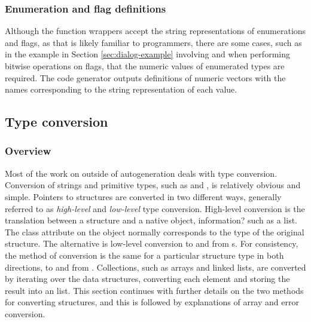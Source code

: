 \documentclass[article,shortnames]{jss}
\begin{document}
\subsubsection{Enumeration and flag definitions}
Although the function wrappers accept the string representations of
enumerations 
and flags, as that is likely familiar to  programmers,
there are
some cases, such as in the example in Section \ref{sec:dialog-example}
involving 
 and when performing bitwise operations on
flags, that the
numeric values of enumerated types are required. The code generator
outputs 
definitions of  numeric vectors with the names
corresponding to the
string representation of each value.

\subsection{Type conversion}

\subsubsection{Overview}

Most of the work on  outside of autogeneration deals with
type 
conversion. Conversion of strings and primitive  types,
such as  and 
, is relatively obvious and simple. Pointers to
 structures are converted
in two different ways, generally referred to as \emph{high-level}
and \emph{low-level} type conversion. 
High-level conversion is the
translation
between a  structure and a native  object,
information?
such as a list. The class attribute on the object normally corresponds
to the type of the original  structure. 
The alternative is low-level conversion to and from
 s. For consistency, the method of
conversion is 
the same for a particular structure type in both directions, to and
from .
Collections, such as arrays and linked 
lists, are converted by iterating over the data structures, converting
each
element and storing the result into an  list. This section
continues
with further details on the two methods for converting 
structures, and this is followed by explanations of array and error
conversion.
\end{document}
